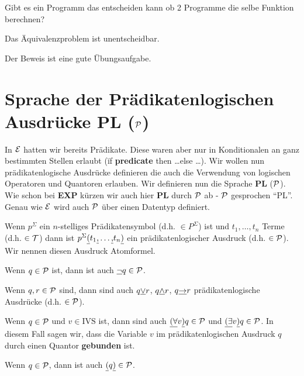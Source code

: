 \begin{defn}[Äquivalenzproblem]
Gibt es ein Programm das entscheiden kann ob 2 Programme die selbe Funktion berechnen?
\end{defn}

\begin{satz}
Das Äquivalenzproblem ist unentscheidbar.
\end{satz}

Der Beweis ist eine gute Übungsaufgabe.

\section{Sprache der Prädikatenlogischen Ausdrücke PL ($\mathcal{P}$)}
In $\mathcal{E}$ hatten wir bereits Prädikate. Diese waren aber nur in Konditionalen an ganz bestimmten Stellen erlaubt (\u{if \textbf{predicate} then \ldots else \ldots}).
Wir wollen nun prädikatenlogische Ausdrücke definieren die auch die Verwendung von logischen Operatoren und Quantoren erlauben.
Wir definieren nun die Sprache \textbf{PL} ($\mathcal{P}$). Wie schon bei \textbf{EXP} kürzen wir auch hier \textbf{PL} durch $\mathcal{P}$ ab - $\mathcal{P}$ gesprochen ``PL''.
Genau wie $\mathcal{E}$ wird auch $\mathcal{P}$ über einen Datentyp definiert.

\begin{defn}
\begin{\whichenum}
\item Wenn $p^{\Sigma}$ ein $n$-stelliges Prädikatensymbol (d.h. $\in P^{\Sigma}$) ist und $t_1,\ldots,t_n$ Terme
(d.h. $\in \mathcal{T}$) dann ist $p^{\Sigma}\text{\underline{(}}t_1\text{\underline{,}}\ldots\text{\underline{,}}t_n\text{\underline{)}}$ ein prädikatenlogischer Ausdruck (d.h. $\in \mathcal{P}$).
Wir nennen diesen Ausdruck Atomformel.
\item Wenn $q \in \mathcal{P}$ ist, dann ist auch $\underline{\text{$\neg$}}q \in \mathcal{P}$.
\item Wenn $q,r \in \mathcal{P}$ sind, dann sind auch $q\underline{\vee}r$,
$q\underline{\wedge}r$, $q\underline{\to}r$ prädikatenlogische Ausdrücke (d.h. $\in \mathcal{P}$).
\item Wenn $q \in \mathcal{P}$ und $v \in \text{IVS}$ ist, dann sind auch
$\underline{(\text{$\forall$}}v\underline{)}q \in \mathcal{P}$ und $\underline{(\text{$\exists$}}v\underline{)}q \in \mathcal{P}$.
In diesem Fall sagen wir, dass die Variable $v$ im prädikatenlogischen Ausdruck $q$ durch einen Quantor \textbf{gebunden} ist.
\item Wenn $q \in \mathcal{P}$, dann ist auch $\text{\underline{(}}q\text{\underline{)}} \in \mathcal{P}$.
\end{\whichenum}
\end{defn}


